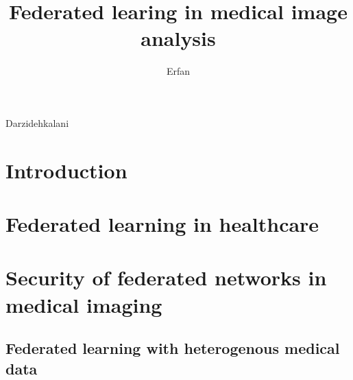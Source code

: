 \documentclass{dissertation}
\begin{document}
\title{Federated learing in medical image analysis}
\author{Erfan}{Darzidehkalani}

\frontmatter


% 

\tableofcontents


\mainmatter

\thumbtrue
\part{Introduction}
\begin{refsection}


\end{refsection}
\part{Federated learning in healthcare }

\begin{refsection}


\end{refsection}
% 
\begin{refsection}

\end{refsection}

\part{Security of federated networks in medical imaging}

\begin{refsection}



\end{refsection}
\begin{refsection}


\end{refsection}
\begin{refsection}

\part{Federated learning with heterogenous medical data}


\end{refsection}
\end{document}
